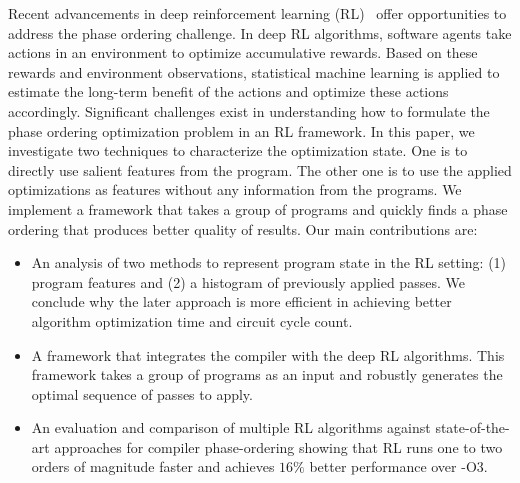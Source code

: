 Recent advancements in deep reinforcement learning (RL)~\cite{sutton1998} offer opportunities to address the phase ordering challenge. 
In deep RL algorithms, software agents take actions in an environment to optimize accumulative rewards. 
Based on these rewards and environment observations, statistical machine learning is applied to estimate the long-term benefit of the actions and optimize these actions accordingly. 
Significant challenges exist in understanding how to formulate the phase ordering optimization problem in an RL framework. 
In this paper, we investigate two techniques to characterize the optimization state.
One is to directly use salient features from the program.
The other one is to use the applied optimizations as features without any information from the programs. 
We implement a framework that takes a group of programs and quickly finds a phase ordering that produces better quality of results.
Our main contributions are:
\begin{itemize}
    \item An analysis of two methods to represent program state in the RL setting: (1) program features and (2) a histogram of previously applied passes. We conclude why the later approach is more efficient in achieving better algorithm optimization time and circuit cycle count.
    \item A framework that integrates the compiler with the deep RL algorithms. This framework takes a group of programs as an input and robustly generates the optimal sequence of passes to apply. 
    \item An evaluation and comparison of multiple RL algorithms against state-of-the-art approaches for compiler phase-ordering showing that RL runs one to two orders of magnitude faster and achieves $16\%$ better performance over -O3.
\end{itemize}

